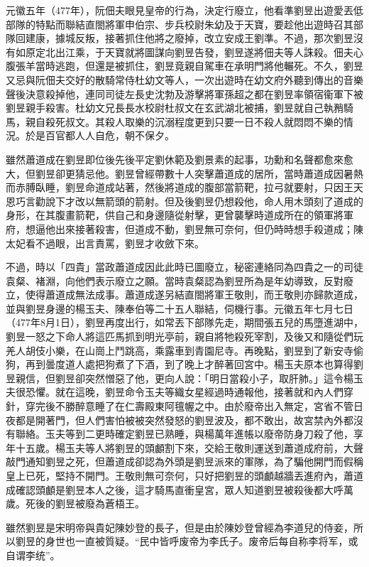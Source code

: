 元徽五年（477年），阮佃夫眼見皇帝的行為，決定行廢立，他看準劉昱出遊愛丟低部隊的特點而聯結直閤將軍申伯宗、步兵校尉朱幼及于天寶，要趁他出遊時召其部隊回建康，據城反叛，接著抓住他將之廢掉，改立安成王劉準。不過，那次劉昱沒有如原定北出江乘，于天寶就將圖謀向劉昱告發，劉昱遂將佃夫等人誅殺。佃夫心腹張羊當時逃跑，但還是被抓住，劉昱竟親自駕車在承明門將他輾死。不久，劉昱又忌與阮佃夫交好的散騎常侍杜幼文等人，一次出遊時在幼文府外聽到傳出的音樂聲後決意殺掉他，連同司徒左長史沈勃及游擊將軍孫超之都在劉昱率領宿衞軍下被劉昱親手殺害。杜幼文兄長長水校尉杜叔文在玄武湖北被捕，劉昱就自己執矟騎馬，親自殺死叔文。其殺人取樂的沉溺程度更到只要一日不殺人就悶悶不樂的情況。於是百官都人人自危，朝不保夕。

雖然蕭道成在劉昱即位後先後平定劉休範及劉景素的起事，功勳和名聲都愈來愈大，但劉昱卻更猜忌他。劉昱曾經帶數十人突擊蕭道成的居所，當時蕭道成因暑熱而赤膊臥睡，劉昱命道成站著，然後將道成的腹部當箭靶，拉弓就要射，只因王天恩巧言勸說下才改以無箭頭的箭射。但及後劉昱仍想殺他，命人用木頭刻了道成的身形，在其腹畫箭靶，供自己和身邊隨從射擊，更曾襲擊時道成所在的領軍將軍府，想逼他出來接著殺害，但道成不動，劉昱無可奈何，但仍時時想手殺道成；陳太妃看不過眼，出言責罵，劉昱才收斂下來。

不過，時以「四貴」當政蕭道成因此此時已圖廢立，秘密連絡同為四貴之一的司徒袁粲、褚淵，向他們表示廢立之願。當時袁粲認為劉昱所為是年幼導致，反對廢立，使得蕭道成無法成事。蕭道成遂另結直閤將軍王敬則，而王敬則亦歸款道成，並與劉昱身邊的楊玉夫、陳奉伯等二十五人聯結，伺機行事。元徽五年七月七日（477年8月1日），劉昱再度出行，如常丟下部隊先走，期間張五兒的馬墮進湖中，劉昱一怒之下命人將這匹馬抓到明光亭前，親自將牠殺死宰割，及後又和隨從們玩羌人胡伎小樂，在山崗上鬥跳高，乘露車到青園尼寺。再晚點，劉昱到了新安寺偷狗，再到曇度道人處把狗煮了下酒，到了晚上才醉著回宮中。楊玉夫原本也算得劉昱親信，但劉昱卻突然憎惡了他，更向人說：「明日當殺小子，取肝肺。」這令楊玉夫很恐懼。就在這晚，劉昱命令玉夫等織女星經過時通報他，接著就和內人們穿針，穿完後不勝醉意睡了在仁壽殿東阿氊幄之中。由於廢帝出入無定，宮省不管日夜都是開著門，但人們害怕被被突然發怒的劉昱波及，都不敢出，故宮禁內外都沒有聯絡。玉夫等到二更時確定劉昱已熟睡，與楊萬年進帳以廢帝防身刀殺了他，享年十五歲。楊玉夫等人將劉昱的頭顱割下來，交給王敬則運送到蕭道成府前，大聲敲門通知劉昱之死，但蕭道成卻認為外頭是劉昱派來的軍隊，為了騙他開門而假稱皇上已死，堅持不開門。王敬則無可奈何，只好把劉昱的頭顱越牆丟進府內，蕭道成確認頭顱是劉昱本人之後，這才騎馬直衝皇宮，眾人知道劉昱被殺後都大呼萬歲。死後的劉昱被廢為蒼梧王。

雖然劉昱是宋明帝與貴妃陳妙登的長子，但是由於陳妙登曾經為李道兒的侍妾，所以劉昱的身世也一直被質疑。“民中皆呼废帝为李氏子。废帝后每自称李将军，或自谓李统”。


